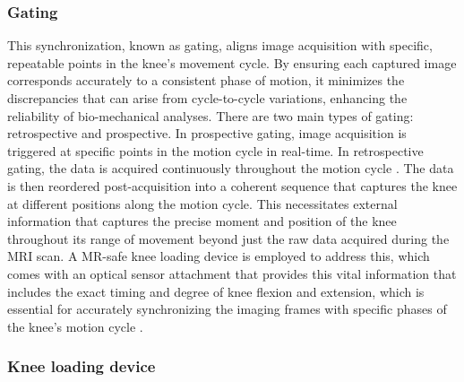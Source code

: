 \documentclass{micro-econ-thesis}
\begin{document}
\subsubsection{Gating} 

This synchronization, known as gating, aligns image acquisition with specific, repeatable points in the knee's movement cycle. By ensuring each captured image corresponds accurately to a consistent phase of motion, it minimizes the discrepancies that can arise from cycle-to-cycle variations, enhancing the reliability of bio-mechanical analyses. There are two main types of gating: retrospective and prospective. In prospective gating, image acquisition is triggered at specific points in the motion cycle in real-time. In retrospective gating, the data is acquired continuously throughout the motion cycle \parencite{edelman_clinical_1996}. The data is then reordered post-acquisition into a coherent sequence that captures the knee at different positions along the motion cycle. This necessitates external information that captures the precise moment and position of the knee throughout its range of movement beyond just the raw data acquired during the MRI scan. A MR-safe knee loading device is employed to address this, which comes with an optical sensor attachment that provides this vital information that includes the exact timing and degree of knee flexion and extension, which is essential for accurately synchronizing the imaging frames with specific phases of the knee’s motion cycle \parencite{brisson_novel_2022}. 

\subsubsection{Knee loading device }
\end{document}
